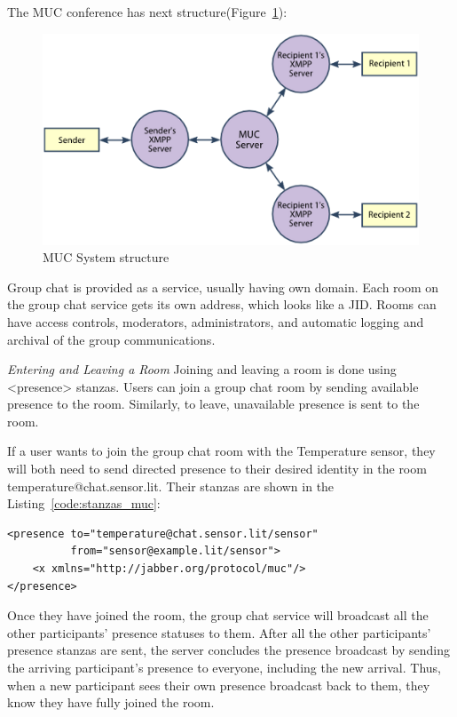 The MUC conference has next structure(Figure~\ref{img:muc-architecture}):
	\begin{figure}[!ht]
		\centering
		\includegraphics[scale=0.8]{images/MUC.png}
		\caption[MUC]{MUC System structure}
		\label{img:muc-architecture}                    
	\end{figure}

Group chat is provided as a service, usually having own domain. Each room on the group chat service gets its own address, which looks like a JID. Rooms can have access controls, moderators, administrators, and automatic logging and archival of the group communications.

\emph{Entering and Leaving a Room}
\newline
Joining and leaving a room is done using <presence> stanzas. Users can join a group chat room by sending available presence to the room. Similarly, to leave, unavailable presence is sent to the room.

If a user wants to join the group chat room with the Temperature sensor, they will both need to send directed presence to their desired identity in the room temperature@chat.sensor.lit. Their stanzas are shown in the Listing~\ref{code:stanzas_muc}:
\begin{lstlisting}[label=code:stanzas_muc,caption=Stanzas Format for MUC]
<presence to="temperature@chat.sensor.lit/sensor"
          from="sensor@example.lit/sensor">
    <x xmlns="http://jabber.org/protocol/muc"/>
</presence>
\end{lstlisting}

Once they have joined the room, the group chat service will broadcast all the other participants' presence statuses to them. After all the other participants’ presence stanzas are sent, the server concludes the presence broadcast by sending the arriving participant’s presence to everyone, including the new arrival. Thus, when a new participant sees their own presence broadcast back to them, they know they have fully joined the room.

